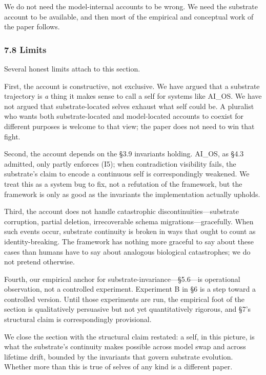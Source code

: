 \documentclass[11pt,letterpaper]{article}
\begin{document}
We do not need the model-internal accounts to be wrong. We need the substrate account to be available, and then most of the empirical and conceptual work of the paper follows.

\subsubsection*{7.8 Limits}

Several honest limits attach to this section.

First, the account is constructive, not exclusive. We have argued that a substrate trajectory is \emph{a} thing it makes sense to call a self for systems like AI\_OS. We have not argued that substrate-located selves exhaust what self could be. A pluralist who wants both substrate-located and model-located accounts to coexist for different purposes is welcome to that view; the paper does not need to win that fight.

Second, the account depends on the §3.9 invariants holding. AI\_OS, as §4.3 admitted, only partly enforces (I5); when contradiction visibility fails, the substrate's claim to encode a continuous self is correspondingly weakened. We treat this as a system bug to fix, not a refutation of the framework, but the framework is only as good as the invariants the implementation actually upholds.

Third, the account does not handle catastrophic discontinuities---substrate corruption, partial deletion, irrecoverable schema migrations---gracefully. When such events occur, substrate continuity is broken in ways that ought to count as identity-breaking. The framework has nothing more graceful to say about these cases than humans have to say about analogous biological catastrophes; we do not pretend otherwise.

Fourth, our empirical anchor for substrate-invariance---§5.6---is operational observation, not a controlled experiment. Experiment B in §6 is a step toward a controlled version. Until those experiments are run, the empirical foot of the section is qualitatively persuasive but not yet quantitatively rigorous, and §7's structural claim is correspondingly provisional.

We close the section with the structural claim restated: a self, in this picture, is what the substrate's continuity makes possible across model swap and across lifetime drift, bounded by the invariants that govern substrate evolution. Whether more than this is true of selves of any kind is a different paper.
\end{document}
